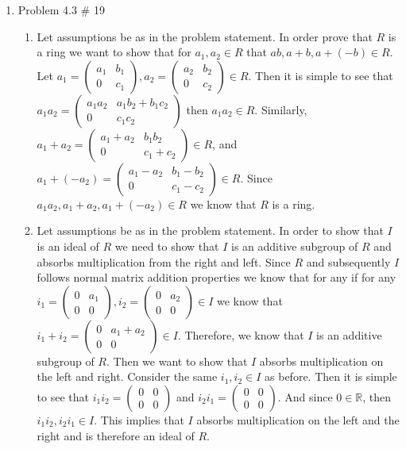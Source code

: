\documentclass[11pt]{article}
\newcommand{\R}{\mathbb{R}}
\begin{document}
\begin{enumerate}
\pagebreak
\item Problem 4.3 \# 19

\begin{enumerate}
    \item 
    
    Let assumptions be as in the problem statement. In order prove that $R$ is a ring we want to show that for $a_1,a_2\in R$ that $ab,a+b,a+(-b)\in R$. Let $a_1 = \begin{pmatrix} a_1 & b_1 \\ 0 & c_1 \end{pmatrix}, a_2 = \begin{pmatrix} a_2 & b_2 \\ 0 & c_2 \end{pmatrix}\in R$. Then it is simple to see that $a_1a_2 = \begin{pmatrix}a_1a_2 & a_1b_2+b_1c_2 \\ 0 & c_1c_2\end{pmatrix}$ then $a_1a_2\in R$. Similarly, $a_1+a_2 = \begin{pmatrix}a_1+a_2 & b_1b_2\\ 0 & c_1+c_2\end{pmatrix}\in R$, and $a_1+(-a_2) = \begin{pmatrix}a_1-a_2 & b_1-b_2\\ 0 & c_1-c_2 \end{pmatrix}\in R$. Since $a_1a_2, a_1+a_2, a_1+(-a_2)\in R$ we know that $R$ is a ring.
    
    \item
    
    Let assumptions be as in the problem statement. In order to show that $I$ is an ideal of $R$ we need to show that $I$ is an additive subgroup of $R$ and absorbs multiplication from the right and left. Since $R$ and subsequently $I$ follows normal matrix addition properties we know that for any if for any $i_1 = \begin{pmatrix}0 & a_1 \\ 0 & 0 \end{pmatrix}, i_2 = \begin{pmatrix}0 & a_2 \\ 0 & 0 \end{pmatrix}\in I$ we know that $i_1+i_2 = \begin{pmatrix}0 & a_1+a_2 \\ 0 & 0 \end{pmatrix}\in I$. Therefore, we know that $I$ is an additive subgroup of $R$. Then we want to show that $I$ absorbs multiplication on the left and right. Consider the same $i_1, i_2\in I$ as before. Then it is simple to see that $i_1i_2 = \begin{pmatrix}0 & 0\\ 0& 0 \end{pmatrix}$ and $i_2i_1 = \begin{pmatrix} 0 & 0\\ 0 & 0 \end{pmatrix}$. And since $0\in \R$, then $i_1i_2, i_2i_1\in I$. This implies that $I$ absorbs multiplication on the left and the right and is therefore an ideal of $R$.
    

\end{enumerate}
\end{enumerate}
\end{document}
